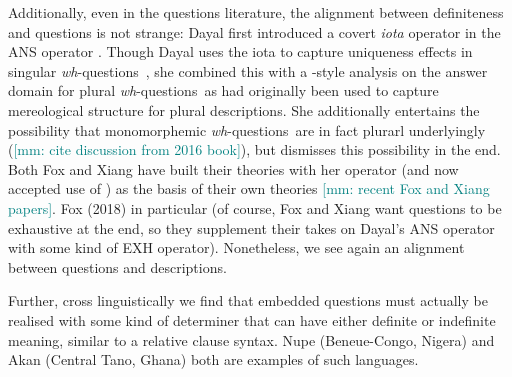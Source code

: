 \documentclass[12pt,letterpaper,table,svgnames,dvipsnames]{article}
\newcommand{\jd}[1]{\textcolor{Purple}{[jd: #1]}}
\newcommand{\mm}[1]{\textcolor{teal}{[mm: #1]}}
\newcommand{\whqs}{\emph{wh}-questions~}
\begin{document}
Additionally, even in the questions literature, the alignment between definiteness and questions is not strange: Dayal first introduced a covert \emph{iota} operator in the ANS operator \cite{srivastav1991,dayal1996,dayal2016}. Though Dayal uses the iota to capture uniqueness effects in singular \whqs, she combined this with a -style analysis on the answer domain for plural \whqs as had originally been used to capture mereological structure for plural descriptions. She additionally entertains the possibility that monomorphemic \whqs are in fact plurarl underlyingly (\mm{cite discussion from 2016 book}), but dismisses this possibility in the end. Both Fox and Xiang have built their theories with her operator (and now accepted use of ) as the basis of their own theories \cite{fox2014,xiang2016}\mm{recent Fox and Xiang papers}. Fox (2018) in particular (of course, Fox and Xiang want questions to be exhaustive at the end, so they supplement their takes on Dayal's ANS operator with some kind of EXH operator). Nonetheless, we see again an alignment between questions and descriptions.

Further, cross linguistically we find that embedded questions must actually be realised with some kind of determiner that can have either definite or indefinite meaning, similar to a relative clause syntax. Nupe (Beneue-Congo, Nigera) and Akan (Central Tano, Ghana) both are examples of such languages.






\end{document}
